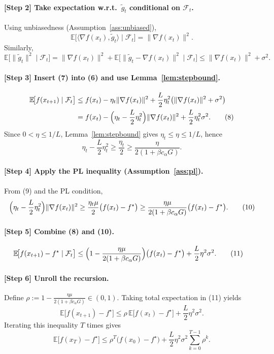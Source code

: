 \documentclass{article}
\begin{document}
\paragraph{[Step 2] Take expectation w.r.t.\ $\tilde g_t$ conditional on $\mathcal{F}_t$.}
Using unbiasedness (Assumption~\ref{ass:unbiased}),
\[
\mathbb{E}\bigl[\langle\nabla f(x_t),\tilde g_t\rangle\mid\mathcal{F}_t\big]
= \|\nabla f(x_t)\|^{2}.
\]
Similarly,
\[
\mathbb{E}\bigl[\|\tilde g_t\|^{2}\mid\mathcal{F}_t\bigr]
= \|\nabla f(x_t)\|^{2}+ \mathbb{E}\bigl[\|\tilde g_t-\nabla f(x_t)\|^{2}\mid\mathcal{F}_t\bigr]
\le \|\nabla f(x_t)\|^{2}+\sigma^{2}.
\tag{7}
\]

\paragraph{[Step 3] Insert (7) into (6) and use Lemma~\ref{lem:stepbound}.}
\begin{align}
\mathbb{E}\!\bigl[f(x_{t+1})\mid\mathcal{F}_t\bigr]
&\le f(x_t)-\eta_t\|\nabla f(x_t)\|^{2}
+\frac{L}{2}\eta_t^{2}\bigl(\|\nabla f(x_t)\|^{2}+\sigma^{2}\bigr)
\notag\\
&= f(x_t)-\Bigl(\eta_t-\frac{L}{2}\eta_t^{2}\Bigr)\|\nabla f(x_t)\|^{2}
+\frac{L}{2}\eta_t^{2}\sigma^{2}.
\tag{8}
\end{align}
Since $0<\eta\le 1/L$, Lemma~\ref{lem:stepbound} gives $\eta_t\le\eta\le 1/L$, hence
\[
\eta_t-\frac{L}{2}\eta_t^{2}\ge \frac{\eta_t}{2}\ge \frac{\eta}{2(1+\beta c_\alpha G)}.
\tag{9}
\]

\paragraph{[Step 4] Apply the PL inequality (Assumption~\ref{ass:pl}).}
From (9) and the PL condition,
\[
\Bigl(\eta_t-\frac{L}{2}\eta_t^{2}\Bigr)\|\nabla f(x_t)\|^{2}
\ge \frac{\eta_t\mu}{2}\bigl(f(x_t)-f^\star\bigr)
\ge \frac{\eta\mu}{2(1+\beta c_\alpha G)}\bigl(f(x_t)-f^\star\bigr).
\tag{10}
\]

\paragraph{[Step 5] Combine (8) and (10).}
\begin{align}
\mathbb{E}\!\bigl[f(x_{t+1})-f^\star\mid\mathcal{F}_t\bigr]
&\le \Bigl(1-\frac{\eta\mu}{2(1+\beta c_\alpha G)}\Bigr)\bigl(f(x_t)-f^\star\bigr)
+\frac{L}{2}\eta^{2}\sigma^{2}.
\tag{11}
\end{align}

\paragraph{[Step 6] Unroll the recursion.}
Define $\rho:=1-\frac{\eta\mu}{2(1+\beta c_\alpha G)}\in(0,1)$.  Taking total expectation in (11) yields
\[
\mathbb{E}\bigl[f(x_{t+1})-f^\star\bigr]\le \rho\,\mathbb{E}\bigl[f(x_t)-f^\star\bigr]+\frac{L}{2}\eta^{2}\sigma^{2}.
\]
Iterating this inequality $T$ times gives
\[
\mathbb{E}\bigl[f(x_T)-f^\star\bigr]\le \rho^{T}\bigl(f(x_0)-f^\star\bigr)
+\frac{L}{2}\eta^{2}\sigma^{2}\sum_{k=0}^{T-1}\rho^{k}.
\tag{12}
\]
\end{document}
